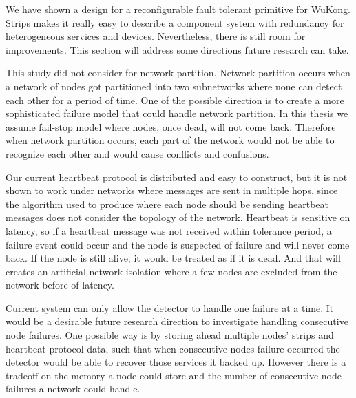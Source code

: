We have shown a design for a reconfigurable fault tolerant primitive for WuKong.
Strips makes it really easy to describe a component system with redundancy for
heterogeneous services and devices. Nevertheless, there is still room for
improvements. This section will address some directions future research can take.

This study did not consider for network partition. Network
partition occurs when a network of nodes got partitioned into two subnetworks where
none can detect each other for a period of time. One of the possible direction
is to create a more sophisticated failure model that could handle network partition.
In this thesis we assume fail-stop model where nodes, once dead, will not come
back. Therefore when network partition occurs, each part of the network would
not be able to recognize each other and would cause conflicts and confusions.

Our current heartbeat protocol is distributed and easy to construct, but it is
not shown to work under networks where messages are sent in multiple hops, since
the algorithm used to produce where each node should be sending heartbeat
messages does not consider the topology of the network. Heartbeat is sensitive
on latency, so if a heartbeat message was not received within tolerance period,
a failure event could occur and the node is suspected of failure and will
never come back. If the node is still alive, it would be treated as if it is
dead. And that will creates an artificial network isolation where a few nodes
are excluded from the network before of latency.

Current system can only allow the detector to handle one failure at a time. It
would be a desirable future research direction to investigate handling
consecutive node failures. One possible way is by storing ahead multiple nodes'
strips and heartbeat protocol data, such that when consecutive nodes failure
occurred the detector would be able to recover those services it backed up.
However there is a tradeoff on the memory a node could store and the number of
consecutive node failures a network could handle.

